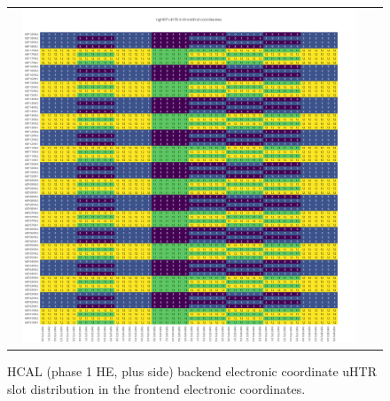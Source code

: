 \begin{figure}[htb]
 \begin{center}
  \begin{tabular}{cc}
   \includegraphics[angle=0,width=0.95\textwidth]{figures/appendix/ngHEP_uHTR_in_FrontEnd.png}
  \end{tabular}
  \caption{HCAL (phase 1 HE, plus side) backend electronic coordinate uHTR slot distribution in the frontend electronic coordinates.}
  \label{fig:lmapngHEPuHTRFEC}
 \end{center}
\end{figure}
\clearpage

